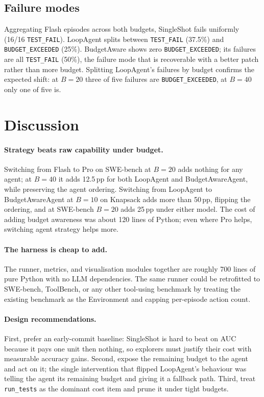 \documentclass[journal=jacsat,manuscript=article]{achemso}
\begin{document}
\subsection{Failure modes}
Aggregating Flash episodes across both budgets, SingleShot fails
uniformly (16/16 \texttt{TEST\_FAIL}). LoopAgent splits between
\texttt{TEST\_FAIL} (37.5\%) and \texttt{BUDGET\_EXCEEDED} (25\%).
BudgetAware shows zero \texttt{BUDGET\_EXCEEDED}; its failures are
all \texttt{TEST\_FAIL} (50\%), the failure mode that is recoverable
with a better patch rather than more budget. Splitting LoopAgent's
failures by budget confirms the expected shift: at $B = 20$ three of
five failures are \texttt{BUDGET\_EXCEEDED}, at $B = 40$ only one of
five is.

\section{Discussion}

\paragraph{Strategy beats raw capability under budget.}
Switching from Flash to Pro on SWE-bench at $B = 20$ adds nothing for
any agent; at $B = 40$ it adds 12.5\,pp for both LoopAgent and
BudgetAwareAgent, while preserving the agent ordering. Switching from
LoopAgent to BudgetAwareAgent at $B = 10$ on Knapsack adds more than
50\,pp, flipping the ordering, and at SWE-bench $B = 20$ adds 25\,pp
under either model. The cost of adding budget awareness was about
120 lines of Python; even where Pro helps, switching agent strategy
helps more.

\paragraph{The harness is cheap to add.}
The runner, metrics, and visualisation modules together are roughly
700 lines of pure Python with no LLM dependencies. The same runner
could be retrofitted to SWE-bench, ToolBench, or any other tool-using
benchmark by treating the existing benchmark as the Environment and
capping per-episode action count.

\paragraph{Design recommendations.}
First, prefer an early-commit baseline: SingleShot is hard to beat
on AUC because it pays one unit then nothing, so explorers must
justify their cost with measurable accuracy gains. Second, expose
the remaining budget to the agent and act on it; the single
intervention that flipped LoopAgent's behaviour was telling the
agent its remaining budget and giving it a fallback path. Third,
treat \texttt{run\_tests} as the dominant cost item and prune it
under tight budgets.
\end{document}
